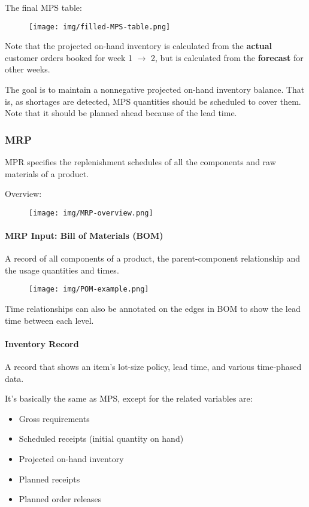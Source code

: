 \documentclass{article}
\begin{document}
The final MPS table:
\begin{figure}[H]
	\centering
	\texttt{[image: img/filled-MPS-table.png]}
\end{figure}

Note that the projected on-hand inventory is calculated from the \textbf{actual} customer orders booked
for week 1 $\rightarrow$ 2,
but is calculated from the \textbf{forecast} for other weeks.

The goal is to maintain a nonnegative projected on-hand inventory balance.
That is, as shortages are detected, MPS quantities should be scheduled to cover them.
Note that it should be planned ahead because of the lead time.

\subsubsection{MRP}

MPR specifies the replenishment schedules of all the components and raw materials of a product.

Overview:
\begin{figure}[H]
	\centering
	\texttt{[image: img/MRP-overview.png]}
\end{figure}

\paragraph{MRP Input: Bill of Materials (BOM)}

A record of all components of a product,
the parent-component relationship and the usage quantities and times.

\begin{figure}[H]
	\centering
	\texttt{[image: img/POM-example.png]}
\end{figure}

Time relationships can also be annotated on the edges in BOM to show the lead time between each level.

\paragraph{Inventory Record}

A record that shows an item's lot-size policy, lead time, and various time-phased data.

It's basically the same as MPS, except for the related variables are:
\begin{itemize}
	\item Gross requirements
	\item Scheduled receipts (initial quantity on hand)
	\item Projected on-hand inventory
	\item Planned receipts
	\item Planned order releases
\end{itemize}
\end{document}
